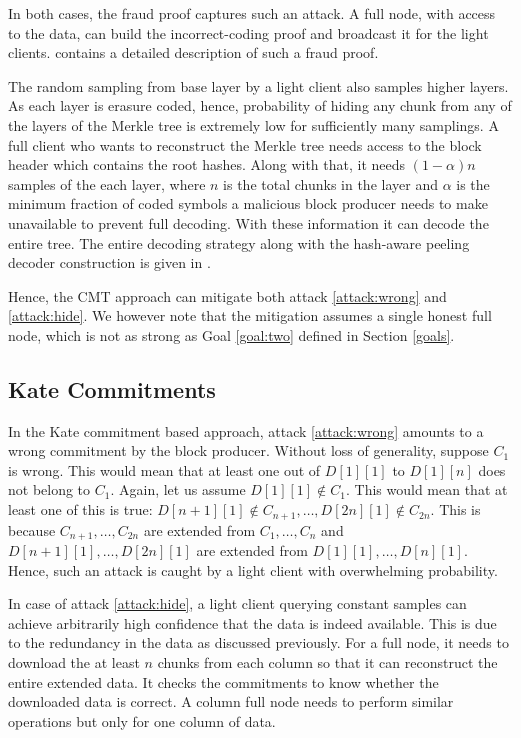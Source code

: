 \documentclass[sigconf, screen=true, nonacm]{acmart}
\begin{document}
        In both cases, the fraud proof captures such an attack. A full node, with access to the data, can build the incorrect-coding proof and broadcast it for the light clients. \cite{yu2019coded} contains a detailed description of such a fraud proof. 

        The random sampling from base layer by a light client also samples higher layers. As each layer is erasure coded, hence, probability of hiding any chunk from any of the layers of the Merkle tree is extremely low for sufficiently many samplings. A full client who wants to reconstruct the Merkle tree needs access to the block header which contains the root hashes. Along with that, it needs $(1-\alpha)n$ samples of the each layer, where $n$ is the total chunks in the layer and $\alpha$ is the minimum fraction of coded symbols a malicious block producer needs to make unavailable to prevent full decoding. With these information it can decode the entire tree. The entire decoding strategy along with the hash-aware peeling decoder construction is given in \cite{yu2019coded}. 

        Hence, the CMT approach can mitigate both attack \ref{attack:wrong} and \ref{attack:hide}.  We however note that the mitigation assumes a single honest full node, which is not as strong as Goal \ref{goal:two} defined in Section \ref{goals}. 

    \subsection{Kate Commitments}
        In the Kate commitment based approach, attack \ref{attack:wrong} amounts to a wrong commitment by the block producer. Without loss of generality, suppose $C_1$ is wrong. This would mean that at least one out of $D[1][1]$ to $D[1][n]$ does not belong to $C_1$. Again, let us assume $D[1][1] \not\in C_1$. This would mean that at least one of this is true: $D[n+1][1] \not\in C_{n+1}, \dots, D[2n][1] \not\in C_{2n}$. This is because $C_{n+1}, \dots, C_{2n}$ are extended from $C_1, \dots, C_n$ and $D[n+1][1], \dots, D[2n][1]$ are extended from $D[1][1], \dots, D[n][1]$. Hence, such an attack is caught by a light client with overwhelming probability. 

        In case of attack \ref{attack:hide}, a light client querying constant samples can achieve arbitrarily high confidence that the data is indeed available. This is due to the redundancy in the data as discussed previously. For a full node, it needs to download the at least $n$ chunks from each column so that it can reconstruct the entire extended data. It checks the commitments to know whether the downloaded data is correct. A column full node needs to perform similar operations but only for one column of data.
        
\end{document}
